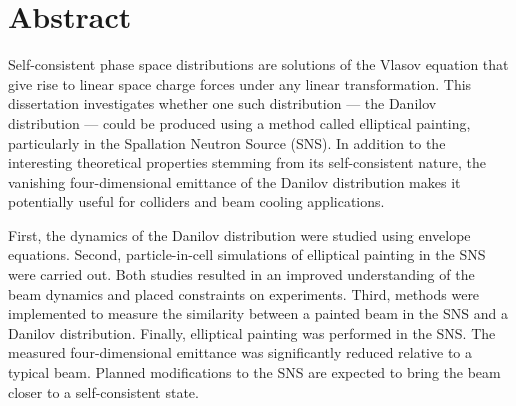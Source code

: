 \chapter*{Abstract} 


Self-consistent phase space distributions are solutions of the Vlasov equation that give rise to linear space charge forces under any linear transformation. This dissertation investigates whether one such distribution — the Danilov distribution — could be produced using a method called elliptical painting, particularly in the Spallation Neutron Source (SNS). In addition to the interesting theoretical properties stemming from its self-consistent nature, the vanishing four-dimensional emittance of the Danilov distribution makes it potentially useful for colliders and beam cooling applications.

First, the dynamics of the Danilov distribution were studied using envelope equations. Second, particle-in-cell simulations of elliptical painting in the SNS were carried out. Both studies resulted in an improved understanding of the beam dynamics and placed constraints on experiments. Third, methods were implemented to measure the similarity between a painted beam in the SNS and a Danilov distribution. Finally, elliptical painting was performed in the SNS. The measured four-dimensional emittance was significantly reduced relative to a typical beam. Planned modifications to the SNS are expected to bring the beam closer to a self-consistent state.
